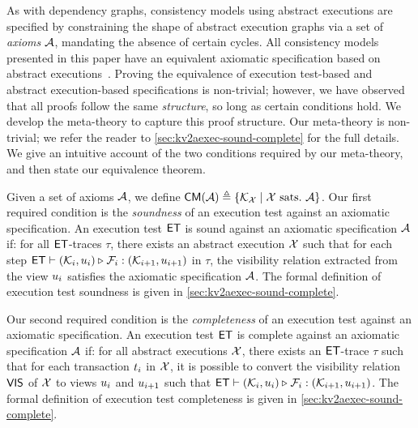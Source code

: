 As with dependency graphs, consistency models using abstract executions are specified by constraining the shape of abstract execution graphs via a set of \emph{axioms} $\mathcal{A}$, \eg mandating the absence of certain cycles.
All consistency models presented in this paper have an equivalent axiomatic specification based on abstract executions~\cite{framework-concur,laws}. 
Proving the equivalence of execution test-based and abstract execution-based specifications is non-trivial; 
however, we have observed that all proofs follow the same \emph{structure}, so long as certain conditions hold. 
We develop the meta-theory to capture this proof structure.
Our meta-theory is non-trivial; we refer the reader to \cref{sec:kv2aexec-sound-complete} for the full details. 
We give an intuitive account of the two conditions required by our meta-theory, and then state our equivalence theorem. 

Given a set of axioms $\mathcal{A}$, we define $\mathsf{CM}(\mathcal{A}) \triangleq \{\mathcal{K}_{\mathcal{X}} \mid \mathcal{X} \text{ sats.\ } \mathcal{A} \}$.
Our first required condition is the  \emph{soundness} of an execution test against an axiomatic specification.
An execution test $\mathsf{ET}$ is sound against an axiomatic specification $\mathcal{A}$ if:
for all \( \mathsf{ET} \)-traces \( \tau \), there exists an abstract execution \( \mathcal{X} \) such that  
for each step \( \mathsf{ET} \vdash (\mathcal{K}_i, u_i) \triangleright_{} \mathcal{F}_i : (\mathcal{K}_{i+1}, u_{i+1}) \) in \( \tau \),
the visibility relation extracted from the view \( u_i \) satisfies the axiomatic specification \( \mathcal{A} \).
The formal definition of execution test soundness is given in \cref{sec:kv2aexec-sound-complete}.



Our second required condition is the  \emph{completeness} of an execution test against an axiomatic specification.
An execution test $\mathsf{ET}$ is complete against an axiomatic specification $\mathcal{A}$ if:
for all abstract executions \( \mathcal{X} \), there exists an \( \mathsf{ET} \)-trace \( \tau \) such that 
for each transaction \( t_i \) in \( \mathcal{X} \),
it is possible to convert the visibility relation $\mathsf{VIS}$ of $\mathcal{X}$ to views \( u_i \) and \( u_{i+1} \) such that
\( \mathsf{ET} \vdash (\mathcal{K}_i, u_i) \triangleright_{} \mathcal{F}_i : (\mathcal{K}_{i+1}, u_{i+1}) \).
The formal definition of execution test completeness is given in \cref{sec:kv2aexec-sound-complete}.
%

